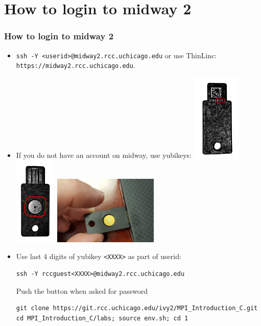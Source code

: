 \documentclass{beamer}
\begin{document}
\section{How to login to midway 2}
\begin{frame}[fragile]
  \frametitle{How to login to midway 2}
  \begin{itemize}
  \item {\color{mycolorcli}\verb|ssh -Y <userid>@midway2.rcc.uchicago.edu|} or use ThinLinc: 
    {\color{mycolorcli}\verb|https://midway2.rcc.uchicago.edu|}.
  \item If you do not have an account on midway, use yubikeys:
 \includegraphics[width=2.3cm]{icons/yubikey1a.jpg}
 \includegraphics[width=2cm]{icons/yubikey2a.jpg}
 \includegraphics[width=5cm]{icons/yubikey3a.jpg}
 \item Use last 4 digits of yubikey {\color{mycolorcli}\verb|<XXXX>|} as part of userid:
{\color{mycolorcli}
\begin{verbatim}
ssh -Y rccguest<XXXX>@midway2.rcc.uchicago.edu
\end{verbatim}
}
Push the button when asked for password
{\tiny
{\color{mycolorcli}
\begin{verbatim}
git clone https://git.rcc.uchicago.edu/ivy2/MPI_Introduction_C.git
cd MPI_Introduction_C/labs; source env.sh; cd 1
\end{verbatim}
}
}
\end{itemize}
\end{frame}
\end{document}
